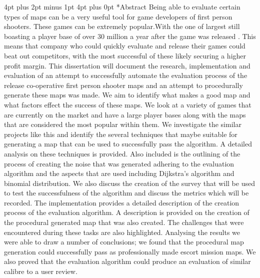 \documentclass[12pt,a4paper,oneside]{book}
\makeatletter
\renewcommand\section{\@startsection {section}{1}{0mm} %
                               {4pt plus 2pt minus 1pt} %
                               {4pt plus 0pt} %
                               {\bfseries}}
\makeatother
\begin{document}
\frontmatter



\pagebreak

\pagebreak

\section*{Abstract}
Being able to evaluate certain types of maps can be a very useful tool for game developers of first person shooters. These games can be extremely popular.With the one of largest still boasting a player base of over 30 million a year after the game was released \cite{OverwatchPopularity}. This means that company who could quickly evaluate and release their games could beat out competitors, with the most successful of these likely securing a higher profit margin.
\vspace{5mm} 
\newline
 This dissertation will document the research, implementation and evaluation of an attempt to successfully automate the evaluation process of the release co-operative first person shooter maps and an attempt to procedurally generate these maps was made. We aim to identify what makes a good map and what factors effect the success of these maps.
 \vspace{5mm} 
 \newline
 We look at a variety of games that are currently on the market and have a large player bases along with the maps that are considered the most popular within them. We investigate the similar projects like this and identify the several techniques that maybe suitable for generating a map that can be used to successfully pass the algorithm.
  \vspace{5mm} 
 \newline
 A detailed analysis on these techniques is provided. Also included is the outlining of the process of creating the noise that was generated adhering to the evaluation algorithm and the aspects that are used including Dijkstra's algorithm and binomial distribution. We also discuss the creation of the survey that will be used to test the successfulness of the algorithm and discuss the metrics which will be recorded. 
  \vspace{5mm} 
 \newline 
 The implementation provides a detailed description of the creation process of the evaluation algorithm. A description is provided on the creation of the procedural generated map that was also created. The challenges that were encountered during these tasks are also highlighted.
  \vspace{5mm} 
 \newline 
Analysing the results we were able to draw a number of conclusions; we found that the procedural map generation could successfully pass as professionally made escort mission maps. We also proved that the evaluation algorithm could produce an evaluation of similar calibre to a user review.
\tableofcontents 
\end{document}

